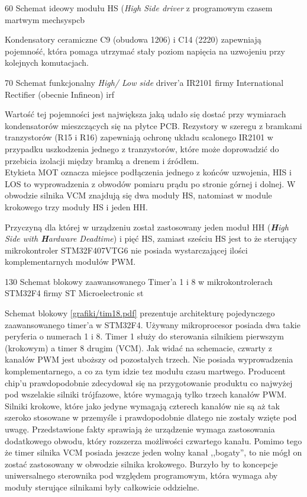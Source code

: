	{60}
	{Schemat ideowy modułu HS ({\it High Side driver} z programowym czasem martwym}
	{mechsyspcb}
	
Kondensatory ceramiczne C9 (obudowa 1206) i C14 (2220) zapewniają pojemność, która pomaga utrzymać stały poziom napięcia na uzwojeniu przy kolejnych komutacjach. 

	{70}
	{Schemat funkcjonalny {\it High/ Low side} driver'a IR2101 firmy International Rectifier (obecnie Infineon)}
	{irf}

Wartość tej pojemności jest największa jaką udało się dostać przy wymiarach kondensatorów mieszczących się na płytce PCB. Rezystory w szeregu z bramkami tranzystorów (R15 i R16) zapewniają ochronę układu scalonego IR2101 w przypadku uszkodzenia jednego z tranzystorów, które może doprowadzić do przebicia izolacji między bramką a drenem i źródłem. \\

Etykieta MOT oznacza miejsce podłączenia jednego z końców uzwojenia, HIS i LOS to wyprowadzenia z obwodów pomiaru prądu po stronie górnej i dolnej. W obwodzie silnika VCM znajdują się dwa moduły HS, natomiast w module krokowego trzy moduły HS i jeden HH.


Przyczyną dla której w urządzeniu został zastosowany jeden moduł HH (\textit{\textbf{H}igh Side with \textbf{H}ardware Deadtime}) i pięć HS, zamiast sześciu HS jest to że sterujący mikrokontroler STM32F407VTG6 nie posiada wystarczającej ilości komplementarnych modułów PWM.

	{130}
	{Schemat blokowy zaawansowanego Timer'a 1 i 8 w mikrokontrolerach STM32F4 firmy ST Microelectronic}
	{st}

Schemat blokowy \ref{grafiki/tim18.pdf} prezentuje architekturę pojedynczego zaawansowanego timer'a w STM32F4. Używany mikroprocesor posiada dwa takie peryferia o numerach 1 i 8. Timer 1 służy do sterowania silnikiem pierwszym (krokowym) a timer 8 drugim (VCM). Jak widać na schemacie, czwarty z kanałów PWM jest uboższy od pozostałych trzech. Nie posiada wyprowadzenia komplementarnego, a co za tym idzie tez modułu czasu martwego. Producent chip'u prawdopodobnie zdecydował się na przygotowanie produktu co najwyżej pod wszelakie silniki trójfazowe, które wymagają tylko trzech kanałów PWM. Silniki krokowe, które jako jedyne wymagają czterech kanałów nie są aż tak szeroko stosowane w przemyśle i prawdopodobnie dlatego nie zostały wzięte pod uwagę. Przedstawione fakty sprawiają że urządzenie wymaga zastosowania dodatkowego obwodu, który rozszerza możliwości czwartego kanału. Pomimo tego że timer silnika VCM posiada jeszcze jeden wolny kanał ,,bogaty'', to nie mógł on zostać zastosowany w obwodzie silnika krokowego. Burzyło by to koncepcje uniwersalnego sterownika pod względem programowym, która wymaga aby moduły sterujące silnikami były całkowicie oddzielne.

